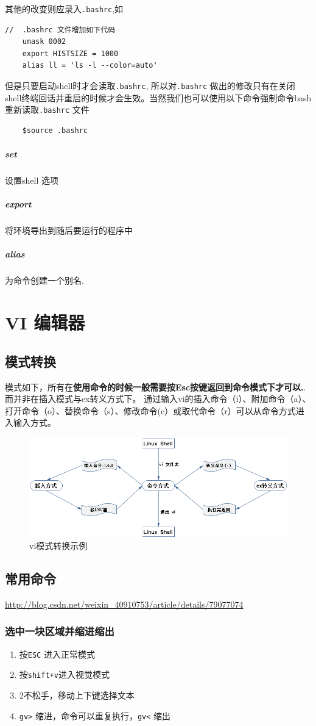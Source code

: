 \documentclass[UTF8,a4paper,12pt]{ctexbook}
\begin{document}
			其他的改变则应录入\verb|.bashrc|,如
			\begin{lstlisting}
//  .bashrc 文件增加如下代码
	umask 0002
	export HISTSIZE = 1000
	alias ll = 'ls -l --color=auto'
			\end{lstlisting}
			
			但是只要启动shell时才会读取\verb|.bashrc|, 所以对\verb|.bashrc| 做出的修改只有在关闭shell终端回话并重启的时候才会生效。当然我们也可以使用以下命令强制命令bash 重新读取\verb|.bashrc| 文件
			
			\begin{lstlisting}
	$source .bashrc
			\end{lstlisting}
		\subparagraph{set}设置shell 选项
		\subparagraph{export}将环境导出到随后要运行的程序中
		\subparagraph{alias}为命令创建一个别名.
		
	\section{VI 编辑器}
		\subsection{模式转换}
			模式如下，所有在\textbf{使用命令的时候一般需要按Esc按键返回到命令模式下才可以.}.而并非在插入模式与ex转义方式下。
			通过输入vi的插入命令（i）、附加命令（a）、打开命令（o）、替换命令（s）、修改命令(c）或取代命令（r）可以从命令方式进入输入方式。
			\begin{figure}[h]
				\centering
				\includegraphics[scale = 0.5]{vi.png}
				\caption{vi模式转换示例}
			\end{figure}
		
		\subsection{常用命令}
			\url{http://blog.csdn.net/weixin_40910753/article/details/79077074}
			\subsubsection{选中一块区域并缩进缩出}
				\begin{enumerate}
					\item 按\verb|ESC| 进入正常模式
					\item 按\verb|shift+v|进入视觉模式
					\item 2不松手，移动上下键选择文本
					\item \verb|gv>| 缩进，命令可以重复执行，\verb|gv<| 缩出
				\end{enumerate}
\end{document}
